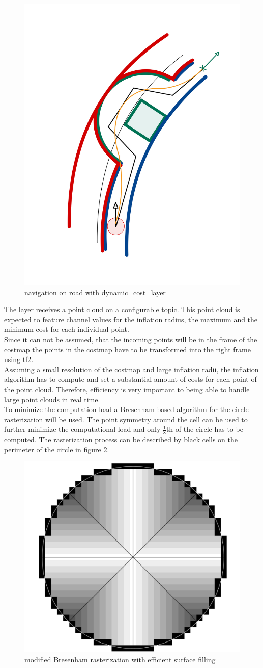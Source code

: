 \begin{figure}
	\centering
	\includegraphics[width=.5\textwidth]{Pictures/inflationlayernav}
	\caption{navigation on road with dynamic\_cost\_layer}
	\label{dynnav}
\end{figure}


The layer receives a point cloud on a configurable topic. This point cloud is expected to feature channel values for the inflation radius, the maximum and the minimum cost for each individual point.\\

Since it can not be assumed, that the incoming points will be in the frame of the costmap the points in the costmap have to be transformed into the right frame using tf2.\\

Assuming a small resolution of the costmap and large inflation radii, the inflation algorithm has to compute and set a substantial amount of costs for each point of the point cloud. Therefore, efficiency is very important to being able to handle large point clouds in real time.\\

To minimize the computation load a Bresenham based algorithm for the circle rasterization will be used\cite{ComputerGraphics}. The point symmetry around the cell can be used to further minimize the computational load and only $\frac{1}{8}$th of the circle has to be computed. The rasterization process can be described by black cells on the perimeter of the circle in figure \ref{rasterization}.\\

\begin{figure}
	\centering
	\includegraphics[width=.5\textwidth]{Pictures/rasterization}
	\caption{modified Bresenham rasterization with efficient surface filling}
	\label{rasterization}
\end{figure}


